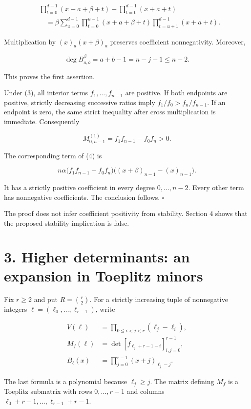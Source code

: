 \documentclass[11pt]{article}
\begin{document}
\[
\begin{aligned}
&\prod_{t=0}^{d-1}(x+a+\beta+t)-\prod_{t=0}^{d-1}(x+a+t)\\
&\quad=\beta\sum_{u=0}^{d-1}
\prod_{t=0}^{u-1}(x+a+\beta+t)\prod_{t=u+1}^{d-1}(x+a+t).
\end{aligned}
\tag{5}
\]

Multiplication by \((x)_a(x+\beta)_a\) preserves coefficient
nonnegativity. Moreover,

\[
\deg B_{a,b}^{\beta}=a+b-1=n-j-1\le n-2.
\]

This proves the first assertion.

Under (3), all interior terms \(f_1,\ldots,f_{n-1}\) are positive. If
both endpoints are positive, strictly decreasing successive ratios imply
\(f_1/f_0>f_n/f_{n-1}\). If an endpoint is zero, the same strict
inequality after cross multiplication is immediate. Consequently

\[
M_{0,n-1}^{(1)}=f_1f_{n-1}-f_0f_n>0.
\]

The corresponding term of (4) is

\[
n\alpha\bigl(f_1f_{n-1}-f_0f_n\bigr)
\bigl((x+\beta)_{n-1}-(x)_{n-1}\bigr).
\tag{6}
\]

It has a strictly positive coefficient in every degree \(0,\ldots,n-2\).
Every other term has nonnegative coefficients. The conclusion follows.
\(\square\)

The proof does not infer coefficient positivity from stability. Section
4 shows that the proposed stability implication is false.

\section{3. Higher determinants: an expansion in Toeplitz
minors}\label{higher-determinants-an-expansion-in-toeplitz-minors}

Fix \(r\ge2\) and put \(R=\binom r2\). For a strictly increasing tuple
of nonnegative integers \(\ell=(\ell_0,\ldots,\ell_{r-1})\), write

\[
\begin{aligned}
V(\ell)&=\prod_{0\le i<j<r}(\ell_j-\ell_i),\\
M_f(\ell)&=\det[f_{\ell_j+r-1-i}]_{i,j=0}^{r-1},\\
B_\ell(x)&=\prod_{j=0}^{r-1}(x+j)_{\ell_j-j}.
\end{aligned}
\tag{7}
\]

The last formula is a polynomial because \(\ell_j\ge j\). The matrix
defining \(M_f\) is a Toeplitz submatrix with rows \(0,\ldots,r-1\) and
columns \(\ell_0+r-1,\ldots,\ell_{r-1}+r-1\).
\end{document}
